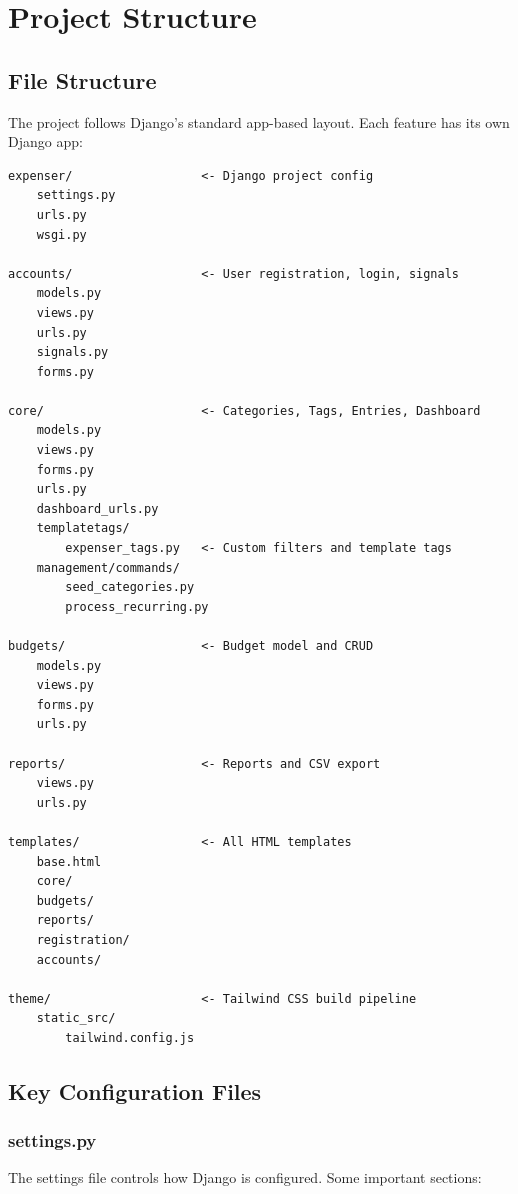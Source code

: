 \documentclass[12pt,a4paper]{report}
\begin{document}
\chapter{Project Structure}

\section{File Structure}

The project follows Django's standard app-based layout. Each feature has its own Django app:

\begin{lstlisting}
expenser/                  <- Django project config
    settings.py
    urls.py
    wsgi.py

accounts/                  <- User registration, login, signals
    models.py
    views.py
    urls.py
    signals.py
    forms.py

core/                      <- Categories, Tags, Entries, Dashboard
    models.py
    views.py
    forms.py
    urls.py
    dashboard_urls.py
    templatetags/
        expenser_tags.py   <- Custom filters and template tags
    management/commands/
        seed_categories.py
        process_recurring.py

budgets/                   <- Budget model and CRUD
    models.py
    views.py
    forms.py
    urls.py

reports/                   <- Reports and CSV export
    views.py
    urls.py

templates/                 <- All HTML templates
    base.html
    core/
    budgets/
    reports/
    registration/
    accounts/

theme/                     <- Tailwind CSS build pipeline
    static_src/
        tailwind.config.js
\end{lstlisting}

\section{Key Configuration Files}

\subsection{settings.py}

The settings file controls how Django is configured. Some important sections:
\end{document}
